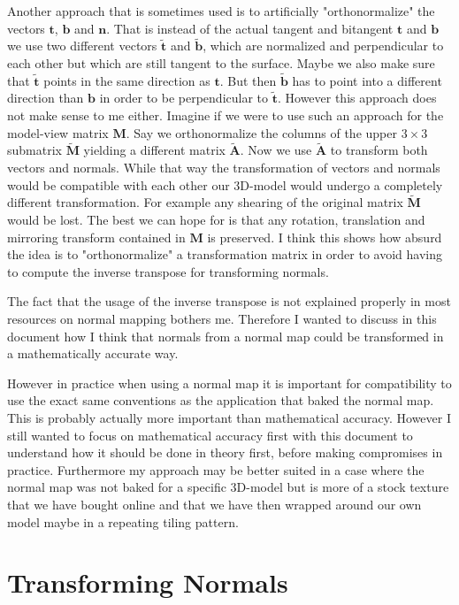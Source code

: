 \documentclass{article}
\newcommand{\vctr}[1]{\mathbf{#1}}
\newcommand{\nrml}[1]{\mathbf{#1}}
\newcommand{\mat}[1]{\mathbf{#1}}
\newcommand{\tangent}{\vctr{t}}
\newcommand{\bitangent}{\vctr{b}}
\newcommand{\normal}{\nrml{n}}
\begin{document}
Another approach that is sometimes used is to artificially "orthonormalize" the vectors \(\tangent\), \(\bitangent\) and \(\normal\). That is instead of the actual tangent and bitangent  \(\tangent\) and \(\bitangent\) we use two different vectors \(\tilde{\tangent}\) and \(\tilde{\bitangent}\), which are normalized and perpendicular to each other but which are still tangent to the surface. Maybe we also make sure that \(\tilde{\tangent}\) points in the same direction as \(\tangent\). But then \(\tilde{\bitangent}\) has to point into a different direction than \(\bitangent\) in order to be perpendicular to \(\tilde{\tangent}\). However this approach does not make sense to me either. Imagine if we were to use such an approach for the model-view matrix \(\mat{M}\). Say we orthonormalize the columns of the upper \(3\times 3\) submatrix \(\mat{\tilde{M}}\) yielding a different matrix \(\mat{\tilde{A}}\). Now we use \(\mat{\tilde{A}}\) to transform both vectors and normals. While that way the transformation of vectors and normals would be compatible with each other our 3D-model would undergo a completely different transformation. For example any shearing of the original matrix \(\mat{\tilde{M}}\) would be lost. The best we can hope for is that any rotation, translation and mirroring transform contained in \(\mat{M}\) is preserved. I think this shows how absurd the idea is to "orthonormalize" a transformation matrix in order to avoid having to compute the inverse transpose for transforming normals.

The fact that the usage of the inverse transpose is not explained properly in most resources on normal mapping bothers me.
Therefore I wanted to discuss in this document how I think that normals from a normal map could be transformed in a mathematically accurate way.

However in practice when using a normal map it is important for compatibility to use the exact same conventions as the application that baked the normal map. This is probably actually more important than mathematical accuracy. However I still wanted to focus on mathematical accuracy first with this document to understand how it should be done in theory first, before making compromises in practice. Furthermore my approach may be better suited in a case where the normal map was not baked for a specific 3D-model but is more of a stock texture that we have bought online and that we have then wrapped around our own model maybe in a repeating tiling pattern.

\section{Transforming Normals}
\end{document}
